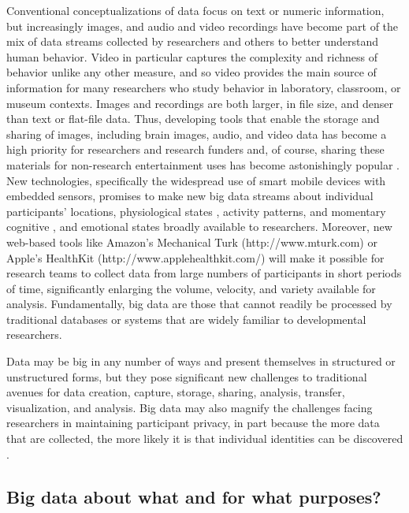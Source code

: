\documentclass[letterpaper,man,apacite]{apa6}
\begin{document}
Conventional conceptualizations of data focus on text or numeric information, but increasingly images, and audio \cite{Mehl} and video recordings have become part of the mix of data streams collected by researchers and others to better understand human behavior.
Video in particular captures the complexity and richness of behavior unlike any other measure, and so video provides the main source of information for many researchers who study behavior in laboratory, classroom, or museum contexts. 
Images and recordings are both larger, in file size, and denser than text or flat-file data. 
Thus, developing tools that enable the storage and sharing of images, including brain images, audio, and video data has become a high priority for researchers and research funders \cite{Databrary2015, openfmri.org} and, of course, sharing these materials for non-research entertainment uses has become astonishingly popular \cite{YouTube2015}.
New technologies, specifically the widespread use of smart mobile devices with embedded sensors, promises to make new big data streams about individual participants' locations, physiological states \cite{Picard}, activity patterns, and momentary cognitive \cite{Sliwinski}, and emotional states broadly available to researchers.
Moreover, new web-based tools like Amazon's Mechanical Turk (http://www.mturk.com) or Apple's HealthKit (http://www.applehealthkit.com/) will make it possible for research teams to collect data from large numbers of participants in short periods of time, significantly enlarging the volume, velocity, and variety available for analysis.   
Fundamentally, big data are those that cannot readily be processed by traditional databases or systems that are widely familiar to developmental researchers.

Data may be big in any number of ways and present themselves in structured or unstructured forms, but they pose significant new challenges to traditional avenues for data creation, capture, storage, sharing, analysis, transfer, visualization, and analysis.
Big data may also magnify the challenges facing researchers in maintaining participant privacy, in part because the more data that are collected, the more likely it is that individual identities can be discovered \cite{sweeney_identifiability}.



\subsection{Big data about what and for what purposes?}
\end{document}
